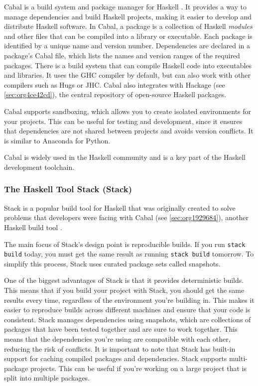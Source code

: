 \documentclass[a4paper, titlepage, twoside]{article}
\begin{document}
Cabal is a build system and package manager for Haskell \autocite{Cabal2023}. It provides a way to manage dependencies and build Haskell projects, making it easier to develop and distribute Haskell software. In Cabal, a package is a collection of Haskell \emph{modules} and other files that can be compiled into a library or executable. Each package is identified by a unique name and version number. Dependencies are declared in a package's Cabal file, which lists the names and version ranges of the required packages. There is a build system that can compile Haskell code into executables and libraries. It uses the GHC compiler by default, but can also work with other compilers such as Hugs or JHC. Cabal also integrates with Hackage (see \ref{sec:org4ce42cd}), the central repository of open-source Haskell packages.

Cabal supports sandboxing, which allows you to create isolated environments for your projects. This can be useful for testing and development, since it ensures that dependencies are not shared between projects and avoids version conflicts. It is similar to Anaconda for Python.

Cabal is widely used in the Haskell community and is a key part of the Haskell development toolchain.

\subsubsection{The Haskell Tool Stack (Stack)}
\label{sec:org4c5b8ff}

Stack is a popular build tool for Haskell that was originally created to solve problems that developers were facing with Cabal (see \ref{sec:org1929684}), another Haskell build tool \autocite{CommercialhaskellStack2023}.

The main focus of Stack's design point is reproducible builds. If you run \texttt{stack build} today, you must get the same result as running \texttt{stack build} tomorrow. To simplify this process, Stack uses curated package sets called snapshots.

One of the biggest advantages of Stack is that it provides deterministic builds. This means that if you build your project with Stack, you should get the same results every time, regardless of the environment you're building in. This makes it easier to reproduce builds across different machines and ensure that your code is consistent. Stack manages dependencies using snapshots, which are collections of packages that have been tested together and are sure to work together. This means that the dependencies you're using are compatible with each other, reducing the risk of conflicts. It is important to note that Stack has built-in support for caching compiled packages and dependencies. Stack supports multi-package projects. This can be useful if you're working on a large project that is split into multiple packages.
\end{document}
